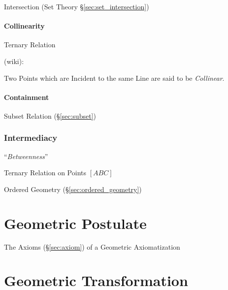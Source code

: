 \fist Intersection (Set Theory \S\ref{sec:set_intersection})



\paragraph{Collinearity}\label{sec:collinearity}\hfill

Ternary Relation

(wiki):

Two Points which are Incident to the same Line are said to be \emph{Collinear}.



\paragraph{Containment}\label{sec:containment}\hfill

\fist Subset Relation (\S\ref{sec:subset})



\subsubsection{Intermediacy}\label{sec:intermediacy}

``\emph{Betweenness}''

Ternary Relation on Points $[ABC]$

Ordered Geometry (\S\ref{sec:ordered_geometry})



\section{Geometric Postulate}\label{sec:geometric_postulate}

The Axioms (\S\ref{sec:axiom}) of a Geometric Axiomatization



\section{Geometric Transformation}\label{sec:geometric_transformation}


